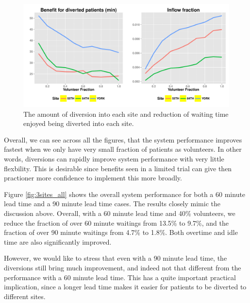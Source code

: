 \begin{figure}[htp]
\centering
\includegraphics[width=.95\textwidth]{chap3/numeric/pic/3sites_gain_flow}
\caption{The amount of diversion into each site and reduction of waiting time
enjoyed being diverted into each site.}
\label{fig:3sites_gain_flow}
\end{figure}

Overall, we can see across all the figures, that the system performance
improves fastest when we only have very small fraction of patients as
volunteers. In other words, diversions can rapidly improve system
performance with very little flexbility. This is desirable since
benefits seen in a limited trial can give then practioner more confidence
to implement this more broadly.

Figure \ref{fig:3sites_all} shows the overall system performance for both a 60 minute
lead time and a 90 minute lead time cases. The results closely mimic the
discussion above. Overall, with a 60 minute lead time and 40\% volunteers,
we reduce the fraction of over 60 minute waitings from 13.5\% to 9.7\%, and the fraction of
over 90 minute waitings from 4.7\% to 1.8\%. Both overtime and idle time
are also significantly improved.

However, we would like to stress that even with a 90 minute lead time, the diversions
still bring much improvement, and indeed not that different from
the performance with a 60 minute lead time. This has a quite important practical
implication, since a longer lead time makes it easier for patients to be
diverted to different sites.

